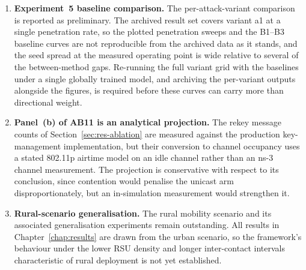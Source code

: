 \documentclass[12pt, a4paper]{report}
\begin{document}
\begin{enumerate}
\item \textbf{Experiment~5 baseline comparison.} The per-attack-variant
comparison is reported as preliminary. The archived result set covers
variant a1 at a single penetration rate, so the plotted penetration
sweeps and the B1--B3 baseline curves are not reproducible from the
archived data as it stands, and the seed spread at the measured
operating point is wide relative to several of the between-method gaps.
Re-running the full variant grid with the baselines under a single
globally trained model, and archiving the per-variant outputs alongside
the figures, is required before these curves can carry more than
directional weight.

\item \textbf{Panel~(b) of AB11 is an analytical projection.} The
rekey message counts of Section~\ref{sec:res-ablation} are measured
against the production key-management implementation, but their
conversion to channel occupancy uses a stated 802.11p airtime model on
an idle channel rather than an ns-3 channel measurement. The projection
is conservative with respect to its conclusion, since contention would
penalise the unicast arm disproportionately, but an in-simulation
measurement would strengthen it.

\item \textbf{Rural-scenario generalisation.} The rural mobility
scenario and its associated generalisation experiments remain
outstanding. All results in Chapter~\ref{chap:results} are drawn from
the urban scenario, so the framework's behaviour under the lower RSU
density and longer inter-contact intervals characteristic of rural
deployment is not yet established.

\end{enumerate}
\end{document}
